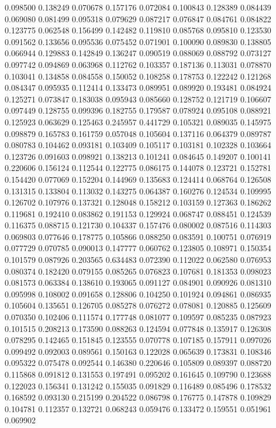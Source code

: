 0.098500
0.138249
0.070678
0.157176
0.072084
0.100843
0.128389
0.084439
0.069080
0.081499
0.095318
0.079629
0.087217
0.076847
0.084761
0.084822
0.123775
0.062548
0.156499
0.142482
0.119810
0.085768
0.095810
0.123530
0.091562
0.133656
0.095536
0.075452
0.071901
0.100090
0.089830
0.138805
0.066944
0.129883
0.142849
0.136247
0.090519
0.088069
0.088792
0.073127
0.097742
0.094869
0.063968
0.112762
0.103357
0.187136
0.113031
0.078870
0.103041
0.134858
0.084558
0.150052
0.108258
0.178753
0.122242
0.121268
0.084347
0.095935
0.112414
0.133473
0.089951
0.089920
0.193481
0.084924
0.125271
0.073847
0.183038
0.095943
0.085660
0.128752
0.121719
0.106607
0.097449
0.128755
0.099396
0.182755
0.179587
0.078924
0.095108
0.088921
0.125923
0.063629
0.125463
0.245957
0.441729
0.105321
0.089035
0.145975
0.098879
0.165783
0.161759
0.057048
0.105604
0.137116
0.064379
0.089787
0.080783
0.104462
0.093181
0.103409
0.105117
0.103181
0.102328
0.103664
0.123726
0.091603
0.098921
0.138213
0.101241
0.084645
0.149207
0.100141
0.220606
0.156124
0.112544
0.122775
0.086175
0.144078
0.123721
0.152781
0.154420
0.077069
0.152204
0.144969
0.135683
0.124414
0.068764
0.126508
0.131315
0.133804
0.113032
0.143275
0.064387
0.160276
0.124534
0.109995
0.126702
0.107976
0.137321
0.128048
0.158212
0.103159
0.127363
0.186262
0.119681
0.192410
0.083862
0.191153
0.129924
0.068747
0.088451
0.124539
0.116375
0.088715
0.121730
0.104337
0.157476
0.080002
0.087516
0.114303
0.069803
0.077646
0.178775
0.105866
0.088250
0.083591
0.100751
0.076919
0.077729
0.070785
0.090013
0.147777
0.060762
0.123805
0.108971
0.150354
0.101579
0.087926
0.203565
0.634483
0.072390
0.112022
0.062580
0.076953
0.080374
0.182420
0.079155
0.085265
0.076823
0.107681
0.181353
0.098023
0.081573
0.063384
0.138610
0.193065
0.091127
0.084901
0.090926
0.081310
0.095998
0.108002
0.091658
0.128806
0.104250
0.101924
0.094861
0.086935
0.105604
0.135651
0.126705
0.085278
0.076272
0.078081
0.120885
0.125609
0.070350
0.102406
0.111574
0.177748
0.081077
0.109597
0.085235
0.087923
0.101515
0.208213
0.173590
0.088263
0.124594
0.077848
0.135917
0.126308
0.078295
0.142465
0.151845
0.123555
0.070778
0.107185
0.157911
0.097026
0.099492
0.092003
0.089561
0.150163
0.122028
0.065639
0.173831
0.108346
0.095322
0.075478
0.092544
0.146380
0.220646
0.105809
0.089397
0.088720
0.115868
0.091812
0.131553
0.197491
0.095202
0.161645
0.109790
0.123688
0.122023
0.156341
0.131242
0.155035
0.091829
0.116489
0.085496
0.178532
0.168592
0.093130
0.215199
0.204522
0.086798
0.176775
0.147878
0.109829
0.104781
0.112357
0.132721
0.068243
0.059476
0.133472
0.159551
0.051961
0.069902

